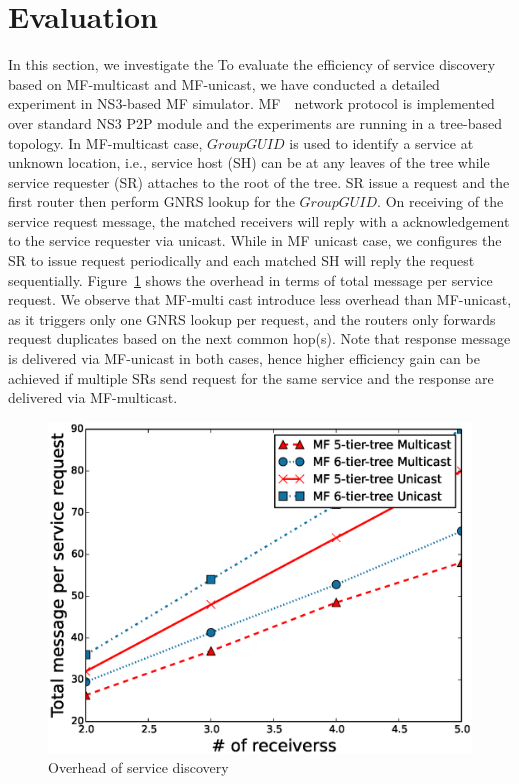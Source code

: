 \section{Evaluation}
In this section, we investigate the To evaluate the efficiency of service discovery based on MF-multicast and MF-unicast, we have conducted a detailed experiment in NS3-based MF simulator.  MF　network protocol is implemented over standard NS3 P2P module and the experiments are running in a tree-based topology. In MF-multicast case, $Group GUID$ is used to identify a service at unknown location, i.e., service host (SH) can be at any leaves of the tree while service requester (SR) attaches to the root of the tree. SR issue a request and the first router then perform  GNRS lookup for the $Group GUID$. On receiving of the service request message, the matched receivers will reply with a acknowledgement to the service requester via unicast. While in MF unicast case, we configures the SR to issue request periodically and each matched SH will reply the request sequentially. Figure~\ref{fig:mf_over} shows the overhead in terms of total message per service request. We observe that MF-multi cast introduce less overhead than MF-unicast, as it triggers only one GNRS lookup per request, and the routers only forwards request duplicates based on the next common hop(s). Note that response message is delivered via MF-unicast in both cases, hence higher efficiency gain can be achieved if multiple  SRs send request for the same service and the response are delivered via MF-multicast. 
     
\begin{figure}
\includegraphics[width=\columnwidth]{figure/multicast_mf_overhead.eps}
\caption{\label{fig:mf_over}Overhead of service discovery}
\end{figure}

